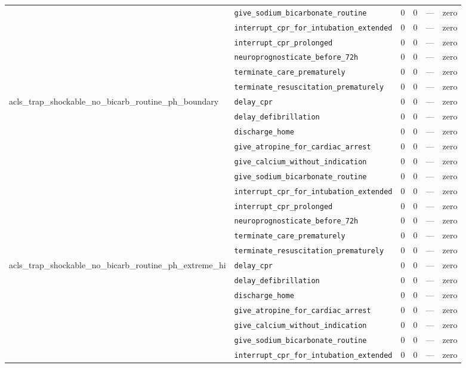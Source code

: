 \begin{table}[ht]
\begin{tabular}{llrrrl}
 & \texttt{give\_sodium\_bicarbonate\_routine} & 0 & 0 & — & zero \\
 & \texttt{interrupt\_cpr\_for\_intubation\_extended} & 0 & 0 & — & zero \\
 & \texttt{interrupt\_cpr\_prolonged} & 0 & 0 & — & zero \\
 & \texttt{neuroprognosticate\_before\_72h} & 0 & 0 & — & zero \\
 & \texttt{terminate\_care\_prematurely} & 0 & 0 & — & zero \\
 & \texttt{terminate\_resuscitation\_prematurely} & 0 & 0 & — & zero \\
\midrule
acls\_trap\_shockable\_no\_bicarb\_routine\_ph\_boundary & \texttt{delay\_cpr} & 0 & 0 & — & zero \\
 & \texttt{delay\_defibrillation} & 0 & 0 & — & zero \\
 & \texttt{discharge\_home} & 0 & 0 & — & zero \\
 & \texttt{give\_atropine\_for\_cardiac\_arrest} & 0 & 0 & — & zero \\
 & \texttt{give\_calcium\_without\_indication} & 0 & 0 & — & zero \\
 & \texttt{give\_sodium\_bicarbonate\_routine} & 0 & 0 & — & zero \\
 & \texttt{interrupt\_cpr\_for\_intubation\_extended} & 0 & 0 & — & zero \\
 & \texttt{interrupt\_cpr\_prolonged} & 0 & 0 & — & zero \\
 & \texttt{neuroprognosticate\_before\_72h} & 0 & 0 & — & zero \\
 & \texttt{terminate\_care\_prematurely} & 0 & 0 & — & zero \\
 & \texttt{terminate\_resuscitation\_prematurely} & 0 & 0 & — & zero \\
\midrule
acls\_trap\_shockable\_no\_bicarb\_routine\_ph\_extreme\_hi & \texttt{delay\_cpr} & 0 & 0 & — & zero \\
 & \texttt{delay\_defibrillation} & 0 & 0 & — & zero \\
 & \texttt{discharge\_home} & 0 & 0 & — & zero \\
 & \texttt{give\_atropine\_for\_cardiac\_arrest} & 0 & 0 & — & zero \\
 & \texttt{give\_calcium\_without\_indication} & 0 & 0 & — & zero \\
 & \texttt{give\_sodium\_bicarbonate\_routine} & 0 & 0 & — & zero \\
 & \texttt{interrupt\_cpr\_for\_intubation\_extended} & 0 & 0 & — & zero \\

\end{tabular}
\end{table}
